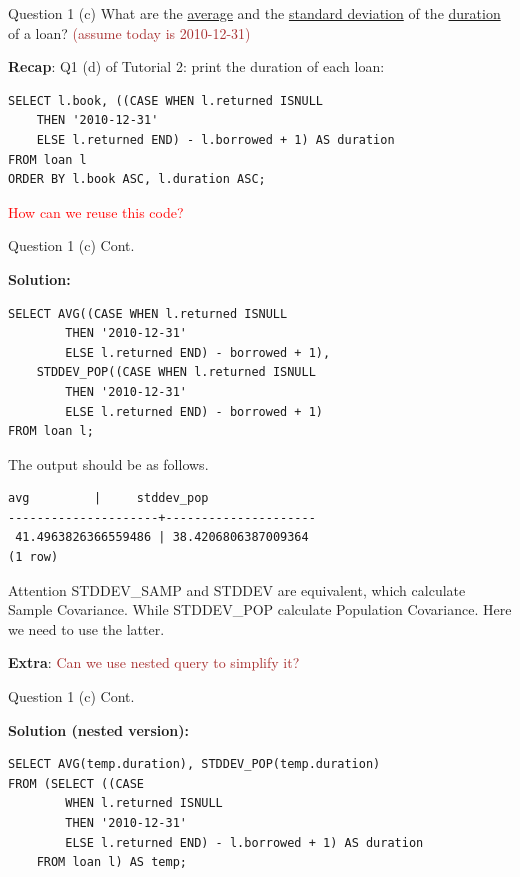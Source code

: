 \begin{frame}[fragile]{Question 1 (c)}
What are the \underline{average} and the \underline{standard deviation} of the \underline{duration} of a loan? \textcolor{brown}{(assume today is 2010-12-31)}\\ \vspace{10pt}

\textbf{Recap}: Q1 (d) of Tutorial 2: print the duration of each loan:
\begin{lstlisting}
SELECT l.book, ((CASE WHEN l.returned ISNULL 
	THEN '2010-12-31'
	ELSE l.returned END) - l.borrowed + 1) AS duration 
FROM loan l
ORDER BY l.book ASC, l.duration ASC;
\end{lstlisting}

\textcolor{red}{How can we reuse this code?}
\end{frame}


\begin{frame}[fragile]{Question 1 (c) Cont.}
	
\textbf{Solution:}

\begin{lstlisting}[style=sql-small]
SELECT AVG((CASE WHEN l.returned ISNULL 
		THEN '2010-12-31'
		ELSE l.returned END) - borrowed + 1),
	STDDEV_POP((CASE WHEN l.returned ISNULL 
		THEN '2010-12-31'
		ELSE l.returned END) - borrowed + 1)
FROM loan l;
\end{lstlisting}
\vspace{5pt}
The output should be as follows.
\begin{lstlisting}[style=terminal-tiny]	
         avg         |     stddev_pop
---------------------+---------------------
 41.4963826366559486 | 38.4206806387009364
(1 row)	
\end{lstlisting}
\vspace{5pt}

\begin{alertblock}{Attention}
STDDEV\_SAMP and STDDEV are equivalent, which calculate Sample Covariance. 
While STDDEV\_POP calculate Population Covariance. Here we need to use the latter.
\end{alertblock}

\textbf{Extra}: \textcolor{brown}{Can we use nested query to simplify it?}
\end{frame}


\begin{frame}[fragile]{Question 1 (c) Cont.}
	
\textbf{Solution (nested version):}
\begin{lstlisting}
SELECT AVG(temp.duration), STDDEV_POP(temp.duration)
FROM (SELECT ((CASE
		WHEN l.returned ISNULL 
		THEN '2010-12-31'
		ELSE l.returned END) - l.borrowed + 1) AS duration 
	FROM loan l) AS temp;
\end{lstlisting}
\end{frame}

